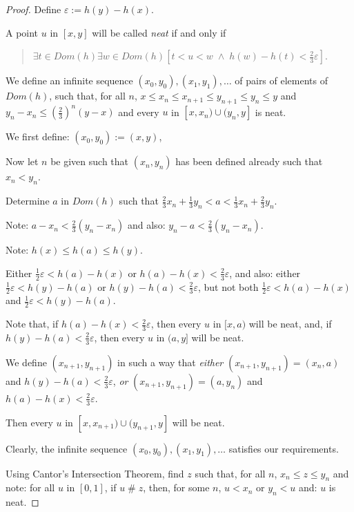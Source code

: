 \documentclass[a4paper]{amsart}
\theoremstyle{plain}
\begin{document}
 \begin{proof} Define $\varepsilon:= h(y)-h(x)$.
 
 A point $u$ in $[x,y]$ will be called {\it neat} if and only if \begin{quote}$\exists t\in Dom(h)\exists w\in Dom(h)[t<u<w \;\wedge\; h(w)-h(t) < \frac{2}{3}\varepsilon]$.\end{quote}
 
 We  define an infinite sequence $(x_0,  y_0), (x_1, y_1), \ldots$ of pairs of elements of $Dom(h)$, such that, for all $n$, $x\le x_n\le x_{n+1}\le y_{n+1}\le y_n\le y$ and $y_n-x_n\le (\frac{2}{3})^n(y-x)$ and every $u$ in $[x,x_n)\cup(y_n, y]$ is neat.  
 
 We first define: $(x_0, y_0):= (x,y)$, 
 
 Now let $n$ be given such that $(x_n, y_n)$ has been defined already such that $x_n< y_n$.
 
 Determine  $a$ in $Dom(h)$ such that $\frac{2}{3}x_n + \frac{1}{3}y_n < a < \frac{1}{3}x_n + \frac{2}{3} y_n$.
 
 Note: $a-x_n<\frac{2}{3}(y_n-x_n)$ and also: $y_n-a<\frac{2}{3}(y_n-x_n)$.
 
 Note: $h(x)\le h(a) \le h(y)$. 
 
  Either $\frac{1}{2}\varepsilon<h(a)-h(x)$ or  $h(a) -h(x) <\frac{2}{3}\varepsilon$, and also: either $\frac{1}{2}\varepsilon<h(y)-h(a)$ or  $h(y) -h(a) <\frac{2}{3}\varepsilon$, but not both $\frac{1}{2}\varepsilon<h(a)-h(x)$ and $\frac{1}{2}\varepsilon<h(y)-h(a)$.

Note that, if $h(a)-h(x)<\frac{2}{3}\varepsilon$, then every $u$ in $[x,a)$ will be neat, and, if $h(y)-h(a)<\frac{2}{3}\varepsilon$, then every $u$ in $(a, y]$ will be neat.
 
  We  define $(x_{n+1}, y_{n+1})$  in such a way that {\it either} $(x_{n+1}, y_{n+1})=(x_n, a)$ and $h(y)-h(a) < \frac{2}{3}\varepsilon$,  {\it or} $(x_{n+1}, y_{n+1})=(a, y_n)$ and $h(a)-h(x) < \frac{2}{3}\varepsilon$.
  
  Then every $u$ in $[x,x_{n+1})\cup(y_{n+1}, y]$ will be neat.
  
  \smallskip Clearly, the infinite sequence $(x_0, y_0), (x_1, y_1), \ldots$ satisfies our requirements.
  
  Using Cantor's Intersection Theorem, find $z$ such that, for all $n$, $x_n\le z \le y_n$ and note: for all $u$ in $[0,1]$, if $u\;\#\;z$, then, for some $n$, $u<x_n$ or $y_n<u$ and: $u$ is neat.\end{proof}
  
\end{document}
